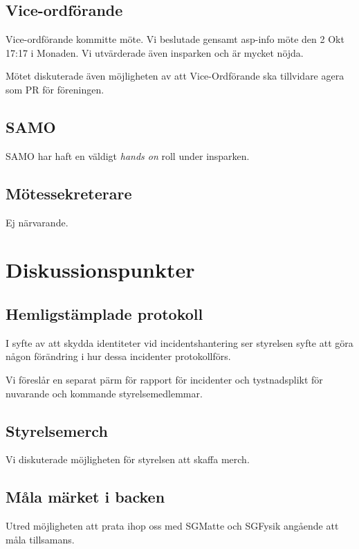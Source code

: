 \documentclass[protokoll]{dvd}
\begin{document}
\subsection{Vice-ordförande}
Vice-ordförande kommitte möte. 
Vi beslutade gensamt asp-info möte den 2 Okt 17:17 i Monaden.
Vi utvärderade även insparken och är mycket nöjda.

Mötet diskuterade även möjligheten av att Vice-Ordförande ska tillvidare agera som PR för föreningen.

\subsection{SAMO}
SAMO har haft en väldigt \textit{hands on} roll under insparken. 

\subsection{Mötessekreterare}

Ej närvarande.


\newpage


\section{Diskussionspunkter}

\subsection*{Hemligstämplade protokoll}

I syfte av att skydda identiteter vid incidentshantering ser styrelsen syfte att göra någon förändring i hur dessa incidenter protokollförs.

Vi föreslår en separat pärm för rapport för incidenter och tystnadsplikt för nuvarande och kommande styrelsemedlemmar.

\subsection*{Styrelsemerch}

Vi diskuterade möjligheten för styrelsen att skaffa merch.

\subsection*{Måla märket i backen}
Utred möjligheten att prata ihop oss med SGMatte och SGFysik angående att måla tillsamans.
\end{document}
